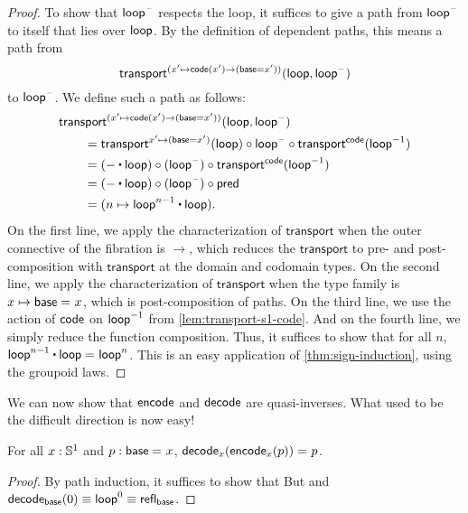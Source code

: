 \begin{proof}
To show that $\mathsf{loop}^{\mathord{\hspace{1pt}\text{--}\hspace{1pt}}}$ respects the loop, it suffices to give a path
from $\mathsf{loop}^{\mathord{\hspace{1pt}\text{--}\hspace{1pt}}}$ to itself that lies over $\mathsf{loop}$.
By the definition of dependent paths, this means a path from
\[\mathsf{transport}^{(x' \mapsto \mathsf{code}(x') \rightarrow (\mathsf{base}=x'))}(\mathsf{loop},\mathsf{loop}^{\mathord{\hspace{1pt}\text{--}\hspace{1pt}}})\]
to $\mathsf{loop}^{\mathord{\hspace{1pt}\text{--}\hspace{1pt}}}$.  We define such a
path as follows:
\begin{align*}
  \MoveEqLeft \transfib {(x' \mapsto \code(x') \rightarrow (\base=x'))} \lloop {\lloop^{\blank}}\\
&= \transfibf {x'\mapsto (\base=x')}(\lloop) \circ {\lloop^{\blank}} \circ \transfibf \code ({\opp \lloop}) \\
&= (- \ct \lloop) \circ (\lloop^{\blank}) \circ \transfibf \code ({\opp \lloop}) \\
&= (- \ct \lloop) \circ (\lloop^{\blank}) \circ \Zpred \\
&= (n \mapsto \lloop^{n - 1} \ct \lloop).
\end{align*}
On the first line, we apply the characterization of $\mathsf{transport}$
when the outer connective of the fibration is $\rightarrow$, which
reduces the $\mathsf{transport}$ to pre- and post-composition with
$\mathsf{transport}$ at the domain and codomain types.  On the second line,
we apply the characterization of $\mathsf{transport}$ when the type family
is $x\mapsto \mathsf{base} =_{} x$, which is post-composition of paths.  On the third line,
we use the action of $\mathsf{code}$ on $\mathord{{\mathsf{loop}}^{-1}}$ from
\cref{lem:transport-s1-code}.  And on the fourth line, we simply
reduce the function composition.  Thus, it suffices to show that for all
$n$, $\id{\lloop^{n - 1} \ct \lloop}{\lloop^{n}}$.  This is an easy application of \cref{thm:sign-induction}, using the groupoid laws.
\end{proof}

We can now show that $\mathsf{encode}$ and $\mathsf{decode}$ are quasi-inverses.
What used to be the difficult direction is now easy!

\begin{lem} \label{lem:s1-decode-encode}
For all $x: \mathbb{S} ^1$ and $p : \mathsf{base} =_{} x$, $\mathsf{decode}_x({{\mathsf{encode}_x(p)}}) =_{} p$.
\end{lem}

\begin{proof}
By path induction, it suffices to show that
But
and $\mathsf{decode}_{\mathsf{base}}(0) \equiv \mathsf{loop}^ 0 \equiv \mathsf{refl}_{\mathsf{base}}$.
\end{proof}

